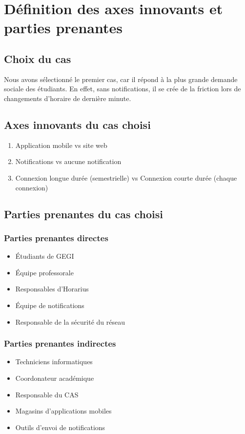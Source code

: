 \section{Définition des axes innovants et parties prenantes}
	\subsection{Choix du cas}
	Nous avons sélectionné le premier cas, car il répond à la plus grande demande sociale des étudiants. En effet, sans notifications, il se crée de la friction lors de changements d'horaire de dernière minute.
	
	\subsection{Axes innovants du cas choisi}
	\begin{enumerate}
		\item Application mobile vs site web
		\item Notifications vs aucune notification
		\item Connexion longue durée (semestrielle) vs Connexion courte durée (chaque connexion)
	\end{enumerate}
	
	\subsection{Parties prenantes du cas choisi}
		\subsubsection{Parties prenantes directes}
		\begin{itemize}
			\item Étudiants de GEGI
			\item Équipe professorale
			\item Responsables d'Horarius
			\item Équipe de notifications
			\item Responsable de la sécurité du réseau
		\end{itemize}
		
		\subsubsection{Parties prenantes indirectes}
		\begin{itemize}
			\item Techniciens informatiques
			\item Coordonateur académique
			\item Responsable du CAS
			\item Magasins d'applications mobiles
			\item Outils d'envoi de notifications
		\end{itemize}
	